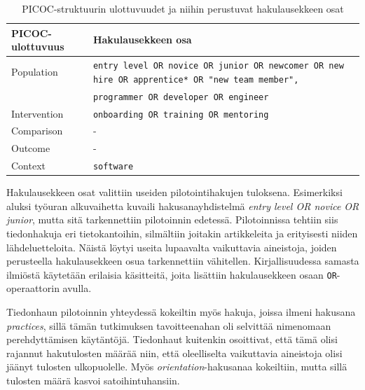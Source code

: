 \documentclass[utf8]{gradu3}
\begin{document}
\begin{table}[h]
    \begin{tabular}{lp{}}
        \toprule
        {PICOC-ulottuvuus} & Hakulausekkeen osa \\
        \midrule
        Population & {\tt entry level OR novice OR junior OR newcomer OR new hire OR apprentice* OR "new team member", } \\
        & {\tt programmer OR developer OR engineer} \\
        \midrule
        Intervention & {\tt onboarding OR training OR mentoring} \\
        \midrule
        Comparison & - \\
        \midrule
        Outcome & - \\
        \midrule
        Context & {\tt software} \\
        \bottomrule
    \end{tabular}  
    \caption{PICOC-struktuurin ulottuvuudet ja niihin perustuvat hakulausekkeen osat}
    \label{tbl:picoc-ulottuvuudet}
\end{table}

Hakulausekkeen osat valittiin useiden pilotointihakujen tuloksena. Esimerkiksi aluksi työuran alkuvaihetta kuvaili hakusanayhdistelmä \textit{entry level OR novice OR junior}, mutta sitä tarkennettiin pilotoinnin edetessä. Pilotoinnissa tehtiin siis tiedonhakuja eri tietokantoihin, silmältiin joitakin artikkeleita ja erityisesti niiden lähdeluetteloita. Näistä löytyi useita lupaavalta vaikuttavia aineistoja, joiden perusteella hakulausekkeen osua tarkennettiin vähitellen. Kirjallisuudessa samasta ilmiöstä käytetään erilaisia käsitteitä, joita lisättiin hakulausekkeen osaan {\tt OR}-operaattorin avulla.

Tiedonhaun pilotoinnin yhteydessä kokeiltin myös hakuja, joissa ilmeni hakusana \textit{practices}, sillä tämän tutkimuksen tavoitteenahan oli selvittää nimenomaan perehdyttämisen käytäntöjä. Tiedonhaut kuitenkin osoittivat, että tämä olisi rajannut hakutulosten määrää niin, että oleelliselta vaikuttavia aineistoja olisi jäänyt tulosten ulkopuolelle. Myös \textit{orientation}-hakusanaa kokeiltiin, mutta sillä tulosten määrä kasvoi satoihintuhansiin. 


\end{document}
